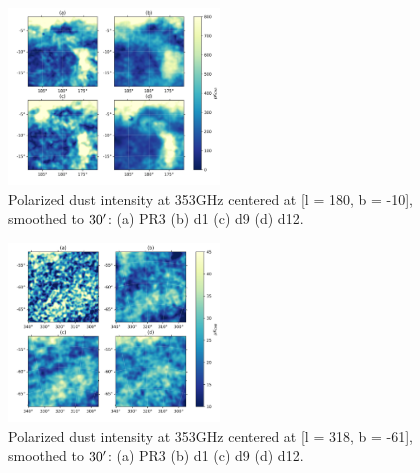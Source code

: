 \documentclass[twocolumn]{aastex631}
\begin{document}
\begin{figure}[ht!]
    \centering
    \includegraphics[width=0.5\textwidth]{figures/pol_gal_plane_smooth_30'.png}
    \caption{Polarized dust intensity at 353GHz centered at [l = 180, b = -10], smoothed to $30\mbox{$^\prime$}$: (a) PR3 (b) d1 (c) d9 (d) d12.}
    \label{fig:353_pol_int_gal_plane}
\end{figure}

\begin{figure}[ht!]
    \centering
    \includegraphics[width=0.5\textwidth]{figures/pol_BK_smooth_30'.png}
    \caption{Polarized dust intensity at 353GHz centered at [l = 318, b = -61], smoothed to $30\mbox{$^\prime$}$: (a) PR3 (b) d1 (c) d9 (d) d12.}
    \label{fig:353_pol_int_BK}
\end{figure}
\end{document}
